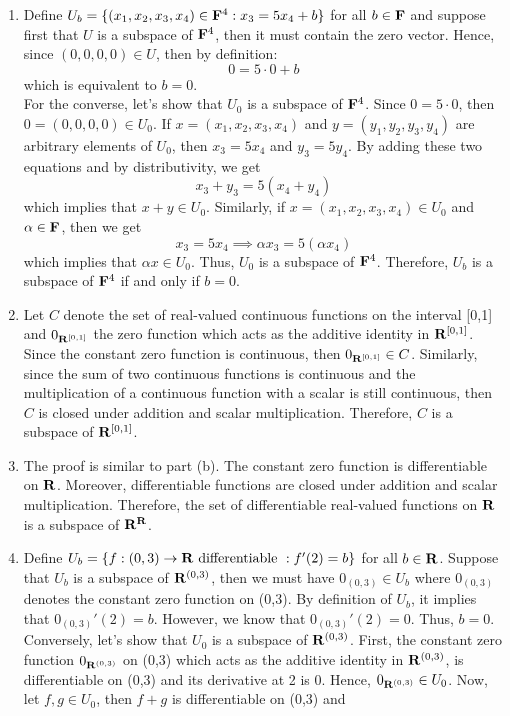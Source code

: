 \begin{solution}
    \begin{enumerate}[label=(\alph*)]
        \item Define $U_b = \{(x_1, x_2, x_3, x_4)\in \mathbf{F}^4 : x_3 = 5x_4 + b\}$ for all $b \in \mathbf{F}$ and suppose first that $U$ is a subspace of $\mathbf{F}^4$, then it must contain the zero vector. Hence, since $(0,0,0,0) \in U$, then by definition: 
        $$0 = 5\cdot 0 + b$$
        which is equivalent to $b=0$. \\
        For the converse, let's show that $U_0$ is a subspace of $\mathbf{F}^4$. Since $0 = 5\cdot 0$, then $0 = (0,0,0,0) \in U_0$. If $x = (x_1, x_2, x_3, x_4)$ and $y = (y_1, y_2, y_3, y_4)$ are arbitrary elements of $U_0$, then $x_3 = 5x_4$ and $y_3 = 5y_4$. By adding these two equations and by distributivity, we get
        $$x_3 + y_3 = 5(x_4 + y_4)$$
        which implies that $x+y \in U_0$. Similarly, if $x = (x_1, x_2, x_3, x_4) \in U_0$ and $\alpha \in \mathbf{F}$, then we get
        $$x_3 = 5x_4 \implies \alpha x_3 = 5(\alpha x_4)$$
        which implies that $\alpha x \in U_0$. Thus, $U_0$ is a subspace of $\mathbf{F}^4$. Therefore, $U_b$ is a subspace of $\mathbf{F}^4$ if and only if $b=0$.
        \item Let $C$ denote the set of real-valued continuous functions on the interval [0,1] and $0_{\mathbf{R}^{[0,1]}}$ the zero function which acts as the additive identity in $\mathbf{R}^{[0,1]}$. Since the constant zero function is continuous, then $0_{\mathbf{R}^{[0,1]}} \in C$. Similarly, since the sum of two continuous functions is continuous and the multiplication of a continuous function with a scalar is still continuous, then $C$ is closed under addition and scalar multiplication. Therefore, $C$ is a subspace of $\mathbf{R}^{[0,1]}$.
        \item The proof is similar to part (b). The constant zero function is differentiable on $\mathbf{R}$. Moreover, differentiable functions are closed under addition and scalar multiplication. Therefore, the set of differentiable real-valued functions on $\mathbf{R}$ is a subspace of $\mathbf{R}^{\mathbf{R}}$.
        \item Define $U_b = \{f:(0,3) \to \mathbf{R} \text{ differentiable } : f'(2) = b\}$ for all $b \in \mathbf{R}$. Suppose that $U_b$ is a subspace of $\mathbf{R}^{(0,3)}$, then we must have $0_{(0,3)} \in U_b$ where $0_{(0,3)}$ denotes the constant zero function on (0,3). By definition of $U_b$, it implies that $0_{(0,3)}'(2) = b$. However, we know that $0_{(0,3)}'(2) = 0$. Thus, $b = 0$. \\
        Conversely, let's show that $U_0$ is a subspace of $\mathbf{R}^{(0,3)}$. First, the constant zero function $0_{\mathbf{R}^{(0,3)}}$ on (0,3) which acts as the additive identity in $\mathbf{R}^{(0,3)}$, is differentiable on (0,3) and its derivative at 2 is 0. Hence, $0_{\mathbf{R}^{(0,3)}} \in U_0$. Now, let $f, g \in U_0$, then $f+g$ is differentiable on (0,3) and

\end{enumerate}
\end{solution}
